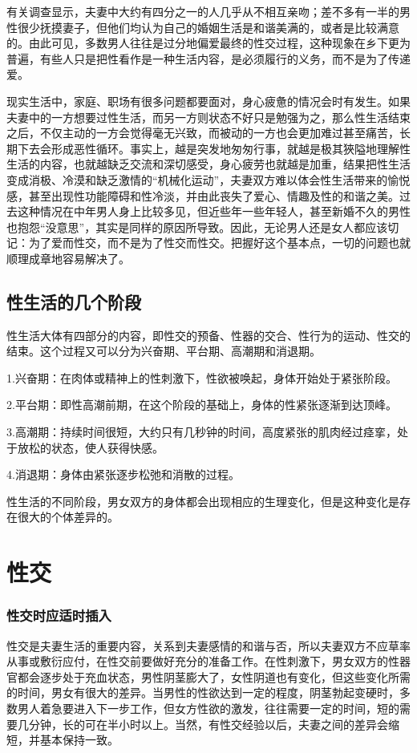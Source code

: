 \documentclass[12pt,UTF8]{ctexbook}
\begin{document}
有关调查显示，夫妻中大约有四分之一的人几乎从不相互亲吻；差不多有一半的男性很少抚摸妻子，但他们均认为自己的婚姻生活是和谐美满的，或者是比较满意的。由此可见，多数男人往往是过分地偏爱最终的性交过程，这种现象在乡下更为普遍，有些人只是把性看作是一种生活内容，是必须履行的义务，而不是为了传递爱。

现实生活中，家庭、职场有很多问题都要面对，身心疲惫的情况会时有发生。如果夫妻中的一方想要过性生活，而另一方则状态不好只是勉强为之，那么性生活结束之后，不仅主动的一方会觉得毫无兴致，而被动的一方也会更加难过甚至痛苦，长期下去会形成恶性循环。事实上，越是突发地匆匆行事，就越是极其狹隘地理解性生活的内容，也就越缺乏交流和深切感受，身心疲劳也就越是加重，结果把性生活变成消极、冷漠和缺乏激情的“机械化运动”，夫妻双方难以体会性生活带来的愉悦感，甚至出现性功能障碍和性冷淡，并由此丧失了爱心、情趣及性的和谐之美。过去这种情况在中年男人身上比较多见，但近些年一些年轻人，甚至新婚不久的男性也抱怨“没意思”，其实是同样的原因所导致。因此，无论男人还是女人都应该切记：为了爱而性交，而不是为了性交而性交。把握好这个基本点，一切的问题也就顺理成章地容易解决了。

\chapter{性生活的几个阶段}

性生活大体有四部分的内容，即性交的预备、性器的交合、性行为的运动、性交的结束。这个过程又可以分为兴奋期、平台期、高潮期和消退期。

1.兴奋期：在肉体或精神上的性刺激下，性欲被唤起，身体开始处于紧张阶段。

2.平台期：即性高潮前期，在这个阶段的基础上，身体的性紧张逐渐到达顶峰。

3.高潮期：持续时间很短，大约只有几秒钟的时间，高度紧张的肌肉经过痉挛，处于放松的状态，使人获得快感。

4.消退期：身体由紧张逐步松弛和消散的过程。

性生活的不同阶段，男女双方的身体都会出现相应的生理变化，但是这种变化是存在很大的个体差异的。

\part{性交}

\section{性交时应适时插入}

性交是夫妻生活的重要内容，关系到夫妻感情的和谐与否，所以夫妻双方不应草率从事或敷衍应付，在性交前要做好充分的准备工作。在性刺激下，男女双方的性器官都会逐步处于充血状态，男性阴茎膨大了，女性阴道也有变化，但这些变化所需的时间，男女有很大的差异。当男性的性欲达到一定的程度，阴茎勃起变硬时，多数男人着急要进入下一步工作，但女方性欲的激发，往往需要一定的时间，短的需要几分钟，长的可在半小时以上。当然，有性交经验以后，夫妻之间的差异会缩短，并基本保持一致。
\end{document}
